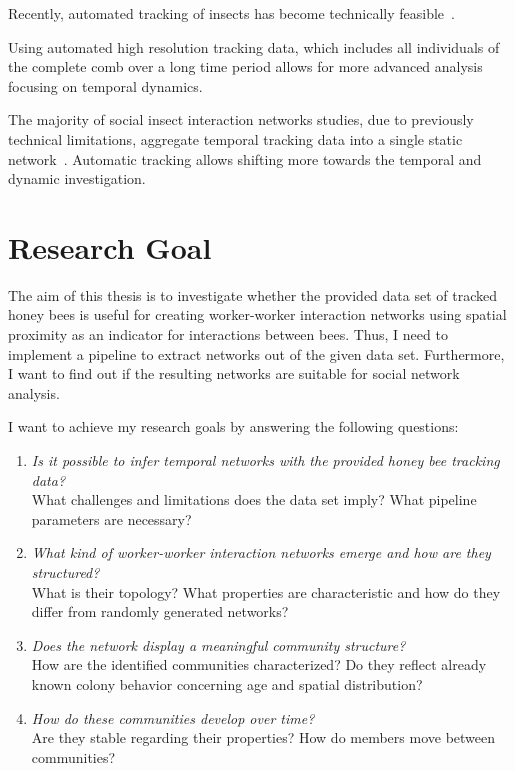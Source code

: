 Recently, automated tracking of insects has become technically feasible~\cite{wario2015automatic, crall2015beetag, fiala2005comparing}.

Using automated high resolution tracking data, which includes all individuals of the complete comb over a long time period allows for more advanced analysis focusing on temporal dynamics.


The majority of social insect interaction networks studies, due to previously technical limitations, aggregate temporal tracking data into a single static network~\cite[Chapter~15]{krause2014animal}.
Automatic tracking allows shifting more towards the temporal and dynamic investigation.


\section{Research Goal}
\label{sec:intro:goals}
The aim of this thesis is to investigate whether the provided data set of tracked honey bees is useful for creating worker-worker interaction networks using spatial proximity as an indicator for interactions between bees. Thus, I need to implement a pipeline to extract networks out of the given data set. Furthermore, I want to find out if the resulting networks are suitable for social network analysis.

I want to achieve my research goals by answering the following questions:

\begin{enumerate}
\item \emph{Is it possible to infer temporal networks with the provided honey bee tracking data?}\\
What challenges and limitations does the data set imply?
What pipeline parameters are necessary?
\item \emph{What kind of worker-worker interaction networks emerge and how are they structured?}\\
What is their topology?
What properties are characteristic and how do they differ from randomly generated networks?
\item \emph{Does the network display a meaningful community structure?}\\
How are the identified communities characterized?
Do they reflect already known colony behavior concerning age and spatial distribution?
\item \emph{How do these communities develop over time?}\\
Are they stable regarding their properties?
How do members move between communities?
\end{enumerate}

